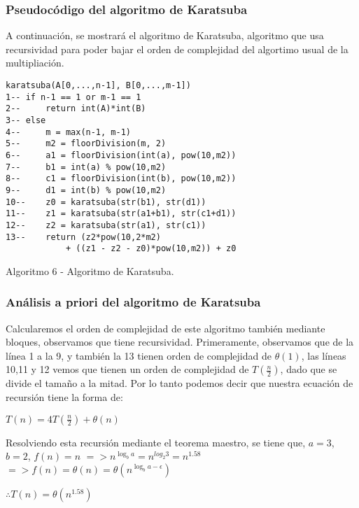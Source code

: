 \documentclass[12pt,twoside]{article}
\begin{document}
\subsubsection{Pseudocódigo del algoritmo de Karatsuba}
A continuación, se mostrará el algoritmo de Karatsuba, algoritmo que usa recursividad para poder bajar el orden de complejidad del algortimo usual de la multipliación.
\begin{lstlisting}
karatsuba(A[0,...,n-1], B[0,...,m-1])
1-- if n-1 == 1 or m-1 == 1
2--     return int(A)*int(B)
3-- else
4--     m = max(n-1, m-1)
5--     m2 = floorDivision(m, 2)
6--     a1 = floorDivision(int(a), pow(10,m2))
7--     b1 = int(a) % pow(10,m2)
8--     c1 = floorDivision(int(b), pow(10,m2))
9--     d1 = int(b) % pow(10,m2)
10--    z0 = karatsuba(str(b1), str(d1))
11--    z1 = karatsuba(str(a1+b1), str(c1+d1))
12--    z2 = karatsuba(str(a1), str(c1))
13--    return (z2*pow(10,2*m2)
            + ((z1 - z2 - z0)*pow(10,m2)) + z0
\end{lstlisting}
\begin{center}
    Algoritmo 6 - Algoritmo de Karatsuba.
\end{center}

\subsubsection{Análisis a priori del algoritmo de Karatsuba}
Calcularemos el orden de complejidad de este algoritmo también mediante bloques, observamos que tiene recursividad. Primeramente, observamos que de la línea 1 a la 9, y también la 13 tienen orden de complejidad de $\theta(1)$, las líneas 10,11 y 12 vemos que tienen un orden de complejidad de $T(\frac{n}{2})$, dado que se divide el tamaño a la mitad. Por lo tanto podemos decir que nuestra ecuación de recursión tiene la forma de:
\begin{center}
    $T(n) = 4T(\frac{n}{2}) + \theta(n)$
\end{center}
Resolviendo esta recursión mediante el teorema maestro, se tiene que, \newline\newline
    $a = 3$, $b = 2$, $f(n) = n$\newline
    $=> n^{\log_b a} = n^{log_2 3} = n^{1.58}$\newline
    $=> f(n) = \theta(n) = \theta(n^{\log_b a - \epsilon})$
\begin{center}
    $\therefore T(n) = \theta(n^{1.58})$
\end{center}
\end{document}
